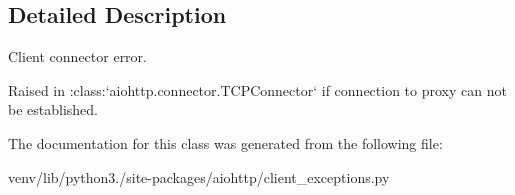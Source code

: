 \subsection{Detailed Description}
\begin{DoxyVerb}Client connector error.

Raised in :class:`aiohttp.connector.TCPConnector` if
    connection to proxy can not be established.
\end{DoxyVerb}
 

The documentation for this class was generated from the following file\+:\begin{DoxyCompactItemize}
\item 
venv/lib/python3./site-\/packages/aiohttp/client\+\_\+exceptions.\+py\end{DoxyCompactItemize}
